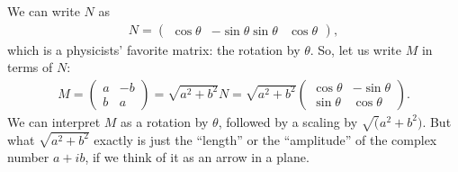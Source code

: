 \documentclass{book}
\theoremstyle{definition}
\begin{document}
We can write $N$ as
\begin{align*}
N = \begin{pmatrix}
\cos\theta & -\sin\theta
\sin\theta & \cos\theta
\end{pmatrix},
\end{align*}
which is a physicists' favorite matrix: the rotation by $\theta$. So, let us write $M$ in terms of $N$:
\begin{align*}
M = \begin{pmatrix}
a & -b\\
b & a
\end{pmatrix} = \sqrt{a^2 + b^2}N = \sqrt{a^2 + b^2}\begin{pmatrix}
\cos\theta & -\sin\theta\\
\sin\theta & \cos\theta
\end{pmatrix}.
\end{align*}
We can interpret $M$ as a rotation by $\theta$, followed by a scaling by $\sqrt(a^2 + b^2)$. But what $\sqrt{a^2 + b^2}$ exactly is just the ``length'' or the ``amplitude'' of the complex number $a+ib$, if we think of it as an arrow in a plane. 
\end{document}
